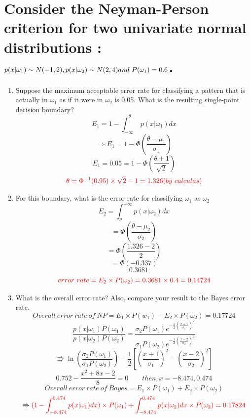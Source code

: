 \documentclass[14pt]{report}
\begin{document}
	\section{Consider the Neyman-Person criterion for two univariate normal distributions : \\ $p(x|\omega_1) \sim N(-1,2) , p(x|\omega_2) \sim N(2,4)\\and\ P(\omega_1)=0.6$.}
	\begin{enumerate}
		\newpage
		\item Suppose the maximum acceptable error rate for classifying a pattern that is actually in $\omega_1$ as if it were in $\omega_2$ is 0.05. What is the resulting single-point decision boundary?
		\[E_1=1-\int_{-\infty}^{\theta}\ p(x|\omega_1)dx\]
		\[\Rightarrow E_1=1-\Phi(\frac{\theta-\mu_1}{\sigma_1})\]
		\[E_1=0.05=1-\Phi(\frac{\theta+1}{\sqrt{2}})\]
		\[\color{red} \theta=\Phi^{-1}(0.95)\times \sqrt{2}-1=1.326(by\ calculas)\]
		
		\item For this boundary, what is the error rate for classifying $\omega_1$ as $\omega_2$
		\[E_2=\int_{\theta}^{-\infty}p(x|\omega_2)dx\]
		\[=\Phi(\frac{\theta-\mu_2}{\sigma_2})\]
		\[=\Phi(\frac{1.326-2}{2})\]
		\[=\Phi(-0.337)\]
		\[=0.3681\]
		\[\color{red} error\ rate=E_2\times P(\omega_2)=0.3681\times 0.4=0.14724\]
		\item What is the overall error rate? Also, compare your result to the Bayes error rate.
		\[Overall\ error\ rate\ of\ NP=E_1\times P(w_1)+E_2\times P(\omega_2)=0.17724\]
		\[\frac{p(x|\omega_1)P(\omega_1)}{p(x|\omega_2)P(\omega_2)}=\frac{\sigma_2 P(\omega_1)e^{-\frac{1}{2}(\frac{x+1}{\sigma_1})^2}}{\sigma_1 P(\omega_2)e^{-\frac{1}{2}(\frac{x-2}{\sigma_2})^2}} \]
		\[\Rrightarrow \ln(\frac{\sigma_2P(\omega_1)}{\sigma_1P(\omega_2)})-\frac{1}{2}[(\frac{x+1}{\sigma_1})^2-(\frac{x-2}{\sigma_2})^2]
		\]
		\[
		0.752-\frac{x^2+8x-2}{8}=0\qquad then,x=-8.474,0.474\]
		\[Overall\ error\ rate\ of\ Bayes=E_1\times P(\omega_1)+E_2\times P(\omega_2) \]
		\[\Rrightarrow\color{red}
		(1-\int_{-8.474}^{0.474}p(x|\omega_1)dx)\times P(\omega_1)+\int_{-8.474}^{0.474}p(x|\omega_2)dx\times P(\omega_2)=0.17824
		\]
	\end{enumerate}
\end{document}
